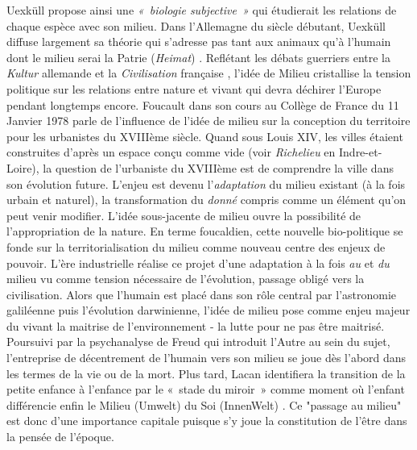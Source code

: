 Uexküll propose ainsi une \textit{« biologie subjective »} qui étudierait les relations de chaque espèce avec son milieu. Dans l’Allemagne du siècle débutant, Uexküll diffuse largement sa théorie qui s’adresse pas tant aux animaux qu’à l’humain dont le milieu serai la Patrie (\textit{Heimat}) \citep{Feuerhahn2009}. Reflétant les débats guerriers entre la \textit{Kultur} allemande et la \textit{Civilisation} française \citep{Elias1975}, l’idée de Milieu cristallise la tension politique sur les relations entre nature et vivant qui devra déchirer l’Europe pendant longtemps encore. Foucault dans son cours au Collège de France du 11 Janvier 1978 parle de l’influence de l’idée de milieu sur la conception du territoire pour les urbanistes du XVIIIème siècle. Quand sous Louis XIV, les villes étaient construites d’après un espace conçu comme vide (voir \textit{Richelieu} en Indre-et-Loire), la question de l’urbaniste du XVIIIème est de comprendre la ville dans son évolution future. L’enjeu est devenu l’\textit{adaptation} du milieu existant (à la fois urbain et naturel), la transformation du \textit{donné} compris comme un élément qu’on peut venir modifier. L’idée sous-jacente de milieu ouvre la possibilité de l’appropriation de la nature. En terme foucaldien, cette nouvelle bio-politique se fonde sur la territorialisation du milieu comme nouveau centre des enjeux de pouvoir. L’ère industrielle réalise ce projet d’une adaptation à la fois \textit{au} et \textit{du} milieu vu comme tension nécessaire de l’évolution, passage obligé vers la civilisation. Alors que l’humain est placé dans son rôle central par l’astronomie galiléenne puis l’évolution darwinienne, l’idée de milieu pose comme enjeu majeur du vivant la maitrise de l’environnement - la lutte pour ne pas être maitrisé. Poursuivi par la psychanalyse de Freud qui introduit l’Autre au sein du sujet, l’entreprise de décentrement de l’humain vers son milieu se joue dès l’abord dans les termes de la vie ou de la mort. Plus tard, Lacan identifiera la transition de la petite enfance à l’enfance par le « stade du miroir » comme moment où l’enfant différencie enfin le Milieu (Umwelt) du Soi (InnenWelt) \citep{Lacan2001}. Ce "passage au milieu" est donc d’une importance capitale puisque s’y joue la constitution de l’être dans la pensée de l'époque.

